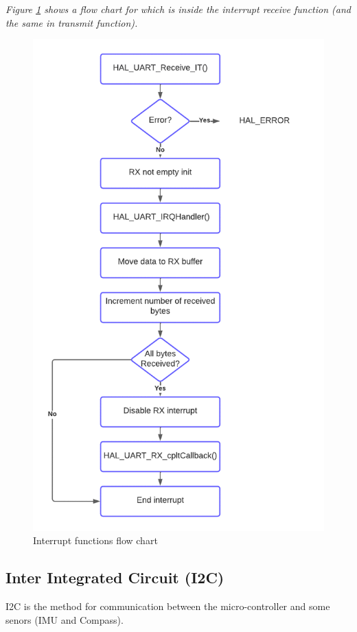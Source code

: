 \begin{enumerate}
\begin{enumerate}
\begin{itemize}
        \end{itemize}
        \clearpage
        \emph{Figure \ref{fig:interrupt-flow-chart} shows a flow chart for which is inside the interrupt receive function (and the same in transmit function).}\\
             \begin{figure}[h]
            \centering
            \includegraphics[width=.65\textwidth]{figure/4_6.png}
            \caption{Interrupt functions flow chart}
            \label{fig:interrupt-flow-chart}
            \end{figure}
       
    \end{enumerate}
\end{enumerate}

\subsection{Inter Integrated Circuit (I2C)}
 I2C is the method for communication between the micro-controller and some senors (IMU and Compass).\\
 
